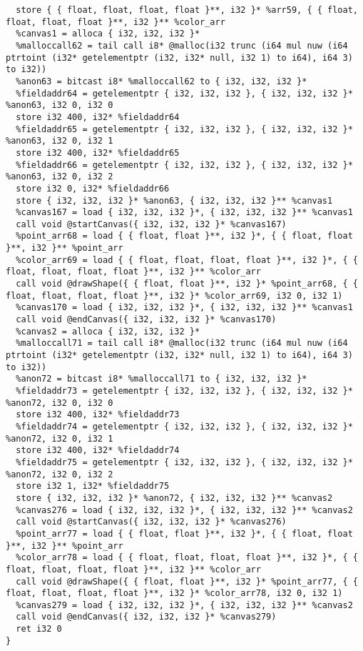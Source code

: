 \documentclass[main.tex]{subfiles}
\begin{document}
{\begin{lstlisting}
  store { { float, float, float, float }**, i32 }* %arr59, { { float, float, float, float }**, i32 }** %color_arr
  %canvas1 = alloca { i32, i32, i32 }*
  %malloccall62 = tail call i8* @malloc(i32 trunc (i64 mul nuw (i64 ptrtoint (i32* getelementptr (i32, i32* null, i32 1) to i64), i64 3) to i32))
  %anon63 = bitcast i8* %malloccall62 to { i32, i32, i32 }*
  %fieldaddr64 = getelementptr { i32, i32, i32 }, { i32, i32, i32 }* %anon63, i32 0, i32 0
  store i32 400, i32* %fieldaddr64
  %fieldaddr65 = getelementptr { i32, i32, i32 }, { i32, i32, i32 }* %anon63, i32 0, i32 1
  store i32 400, i32* %fieldaddr65
  %fieldaddr66 = getelementptr { i32, i32, i32 }, { i32, i32, i32 }* %anon63, i32 0, i32 2
  store i32 0, i32* %fieldaddr66
  store { i32, i32, i32 }* %anon63, { i32, i32, i32 }** %canvas1
  %canvas167 = load { i32, i32, i32 }*, { i32, i32, i32 }** %canvas1
  call void @startCanvas({ i32, i32, i32 }* %canvas167)
  %point_arr68 = load { { float, float }**, i32 }*, { { float, float }**, i32 }** %point_arr
  %color_arr69 = load { { float, float, float, float }**, i32 }*, { { float, float, float, float }**, i32 }** %color_arr
  call void @drawShape({ { float, float }**, i32 }* %point_arr68, { { float, float, float, float }**, i32 }* %color_arr69, i32 0, i32 1)
  %canvas170 = load { i32, i32, i32 }*, { i32, i32, i32 }** %canvas1
  call void @endCanvas({ i32, i32, i32 }* %canvas170)
  %canvas2 = alloca { i32, i32, i32 }*
  %malloccall71 = tail call i8* @malloc(i32 trunc (i64 mul nuw (i64 ptrtoint (i32* getelementptr (i32, i32* null, i32 1) to i64), i64 3) to i32))
  %anon72 = bitcast i8* %malloccall71 to { i32, i32, i32 }*
  %fieldaddr73 = getelementptr { i32, i32, i32 }, { i32, i32, i32 }* %anon72, i32 0, i32 0
  store i32 400, i32* %fieldaddr73
  %fieldaddr74 = getelementptr { i32, i32, i32 }, { i32, i32, i32 }* %anon72, i32 0, i32 1
  store i32 400, i32* %fieldaddr74
  %fieldaddr75 = getelementptr { i32, i32, i32 }, { i32, i32, i32 }* %anon72, i32 0, i32 2
  store i32 1, i32* %fieldaddr75
  store { i32, i32, i32 }* %anon72, { i32, i32, i32 }** %canvas2
  %canvas276 = load { i32, i32, i32 }*, { i32, i32, i32 }** %canvas2
  call void @startCanvas({ i32, i32, i32 }* %canvas276)
  %point_arr77 = load { { float, float }**, i32 }*, { { float, float }**, i32 }** %point_arr
  %color_arr78 = load { { float, float, float, float }**, i32 }*, { { float, float, float, float }**, i32 }** %color_arr
  call void @drawShape({ { float, float }**, i32 }* %point_arr77, { { float, float, float, float }**, i32 }* %color_arr78, i32 0, i32 1)
  %canvas279 = load { i32, i32, i32 }*, { i32, i32, i32 }** %canvas2
  call void @endCanvas({ i32, i32, i32 }* %canvas279)
  ret i32 0
}


\end{lstlisting}}
\end{document}
